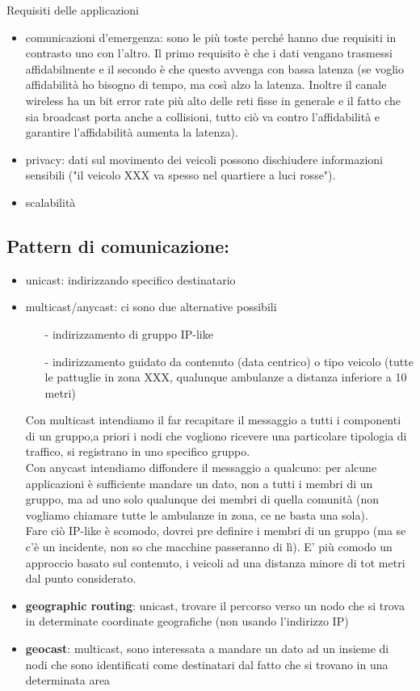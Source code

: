 \documentclass[12pt,italian]{report}
\begin{document}
\noindent Requisiti delle applicazioni
\begin{itemize}
    \item comunicazioni d'emergenza: sono le più toste perché hanno due requisiti in contrasto uno con l'altro. Il primo requisito è che i dati vengano trasmessi affidabilmente e il secondo è che questo avvenga con bassa latenza (se voglio affidabilità ho bisogno di tempo, ma così alzo la latenza. Inoltre il canale wireless ha un bit error rate più alto delle reti fisse in generale e il fatto che sia broadcast porta anche a collisioni, tutto ciò va contro l'affidabilità e garantire l'affidabilità aumenta la latenza).
    \item privacy: dati sul movimento dei veicoli possono dischiudere informazioni sensibili ("il veicolo XXX va spesso nel quartiere a luci rosse").
    \item scalabilità
\end{itemize}

\subsection{Pattern di comunicazione:}
\begin{itemize}
    \item unicast: indirizzando specifico destinatario
    \item multicast/anycast: ci sono due alternative possibili
         \begin{itemize}
             \item [-] indirizzamento di gruppo IP-like
             \item [-] indirizzamento guidato da contenuto (data centrico) o tipo veicolo (tutte le pattuglie in zona XXX, qualunque ambulanze a distanza inferiore a 10 metri)
         \end{itemize}
        Con multicast intendiamo il far recapitare il messaggio a tutti i componenti di un gruppo,a priori i nodi che vogliono ricevere una particolare tipologia di traffico, si registrano in uno specifico gruppo. \\ Con anycast intendiamo diffondere il messaggio a qualcuno: per alcune applicazioni è sufficiente mandare un dato, non a tutti i membri di un gruppo, ma ad uno solo qualunque dei membri di quella comunità (non vogliamo chiamare tutte le ambulanze in zona, ce ne basta una sola). \\ Fare ciò IP-like è scomodo, dovrei pre definire i membri di un gruppo (ma se c'è un incidente, non so che macchine passeranno di lì). E' più comodo un approccio basato sul contenuto, i veicoli ad una distanza minore di tot metri dal punto considerato. 
    \item \textbf{geographic routing}: unicast, trovare il percorso verso un nodo che si trova in determinate coordinate geografiche (non usando l'indirizzo IP)
    \item \textbf{geocast}: multicast, sono interessata a mandare un dato ad un insieme di nodi che sono identificati come destinatari dal fatto che si trovano in una determinata area 
\end{itemize}
\end{document}
